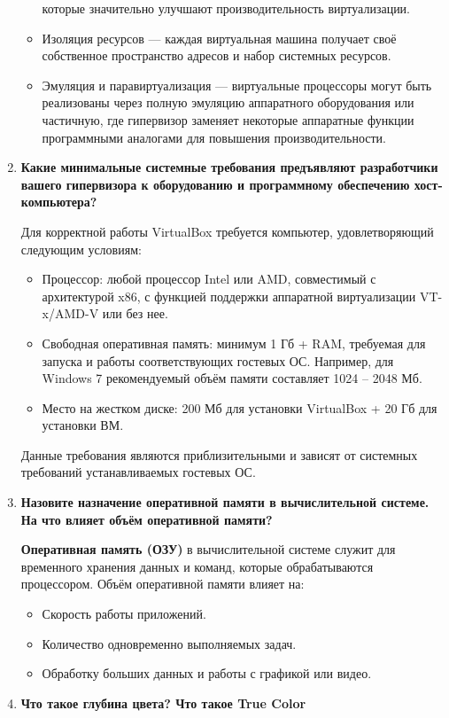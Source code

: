 \begin{enumerate}
\begin{itemize}
				которые значительно улучшают производительность виртуализации.
			\item Изоляция ресурсов --- каждая виртуальная машина получает
				своё собственное пространство адресов
				и набор системных ресурсов.
			\item Эмуляция и паравиртуализация --- виртуальные процессоры
				могут быть реализованы через полную эмуляцию аппаратного
				оборудования или частичную,
				где гипервизор заменяет некоторые аппаратные функции
				программными аналогами для повышения производительности.
		\end{itemize}
	\item \textbf{Какие минимальные системные требования предъявляют
			разработчики вашего гипервизора к оборудованию
			и программному обеспечению хост-компьютера?}\par
		Для корректной работы VirtualBox требуется компьютер,
		удовлетворяющий следующим условиям:
		\begin{itemize}
			\item Процессор: любой процессор Intel или AMD,
				совместимый с архитектурой x86,
				с функцией поддержки аппаратной виртуализации VT-x/AMD-V
				или без нее.
			\item Свободная оперативная память: минимум 1 Гб + RAM,
				требуемая для запуска и работы соответствующих гостевых ОС.
				Например, для Windows 7 рекомендуемый объём памяти составляет
				1024 -- 2048 Мб.
			\item Место на жестком диске:
				200 Мб для установки VirtualBox + 20 Гб для установки ВМ.
		\end{itemize}
		Данные требования являются приблизительными
		и зависят от системных требований устанавливаемых гостевых ОС.
	\item \textbf{Назовите назначение оперативной памяти в вычислительной
			системе. На что влияет объём оперативной памяти?}\par
		\textbf{Оперативная память (ОЗУ)} в вычислительной системе служит
		для временного хранения данных и команд,
		которые обрабатываются процессором.
		Объём оперативной памяти влияет на:
		\begin{itemize}
			\item Скорость работы приложений.
			\item Количество одновременно выполняемых задач.
			\item Обработку больших данных и работы с графикой или видео.
		\end{itemize}
	\item \textbf{Что такое глубина цвета? Что такое True Color
}
\end{enumerate}
